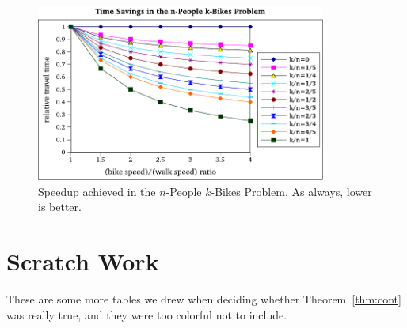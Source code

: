 \documentclass[DIV=calc, paper=a4, fontsize=11pt, twocolumn]{scrartcl}	 %
\newcommand\prob{$n$-People $k$-Bikes Problem}
\begin{document}
\begin{figure}[t]
	\centering
	\includegraphics[width=0.85\textwidth]{graph.pdf}
	\caption{Speedup achieved in the \prob. As always, lower is better.}
	\label{fig:graph}
\end{figure}





\newpage
\appendix
\section{Scratch Work}

These are some more tables we drew when deciding whether Theorem~\ref{thm:cont} was really true, and they were too colorful not to include.
\end{document}
